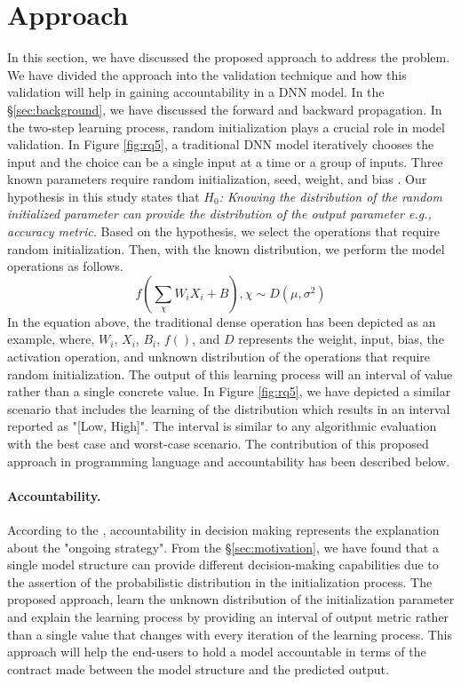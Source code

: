 \section{Approach}
\label{sec:approach}
In this section, we have discussed the proposed approach to address the problem. We have divided the approach into the validation technique and how this validation will help in gaining accountability in a DNN model. In the \S\ref{sec:background}, we have discussed the forward and backward propagation. In the two-step learning process, random initialization plays a crucial role in model validation. In Figure \ref{fig:rq5}, a traditional DNN model iteratively chooses the input and the choice can be a single input at a time or a group of inputs. Three known parameters require random initialization, seed, weight, and bias \cite{sutskever2013importance}. Our hypothesis in this study states that \emph{$H_0$: Knowing the distribution of the random initialized parameter can provide the distribution of the output parameter e.g., accuracy metric.} Based on the hypothesis, we select the operations that require random initialization. Then, with the known distribution, we perform the model operations as follows.
\begin{equation}
f(\sum_{\chi}{W_iX_i+B}), \chi\sim D(\mu, \sigma^2)
\end{equation}
In the equation above, the traditional dense operation has been depicted as an example, where, $W_i$, $X_i$, $B_i$, $f()$, and $D$ represents the weight, input, bias, the activation operation, and unknown distribution of the operations that require random initialization. The output of this learning process will an interval of value rather than a single concrete value. In Figure \ref{fig:rq5}, we have depicted a similar scenario that includes the learning of the distribution which results in an interval reported as "[Low, High]". The interval is similar to any algorithmic evaluation with the best case and worst-case scenario. 
The contribution of this proposed approach in programming language and accountability has been described below.
\paragraph{Accountability.} According to the \cite{veale2018fairness}, accountability in decision making represents the explanation about the "ongoing strategy". From the \S\ref{sec:motivation}, we have found that a single model structure can provide different decision-making capabilities due to the assertion of the probabilistic distribution in the initialization process. The proposed approach, learn the unknown distribution of the initialization parameter and explain the learning process by providing an interval of output metric rather than a single value that changes with every iteration of the learning process. This approach will help the end-users to hold a model accountable in terms of the contract made between the model structure and the predicted output.
